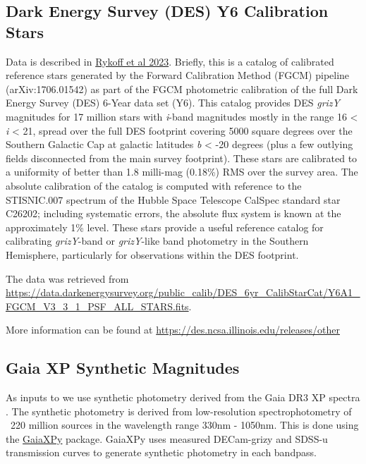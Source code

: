 \subsection{Dark Energy Survey (DES) Y6 Calibration Stars}
\label{sec:des}
Data is described in \href{https://arxiv.org/abs/2305.01695}{Rykoff et al 2023}.
Briefly, this is a catalog of calibrated reference stars generated by the Forward Calibration Method (FGCM) pipeline (arXiv:1706.01542) as part of the FGCM photometric calibration of the full Dark Energy Survey (DES) 6-Year data set (Y6). This catalog provides DES \textit{grizY} magnitudes for 17 million stars with \textit{i}-band magnitudes mostly in the range 16 < \textit{i} < 21, spread over the full DES footprint covering 5000 square degrees over the Southern Galactic Cap at galactic latitudes \textit{b} < -20 degrees (plus a few outlying fields disconnected from the main survey footprint). 
These stars are calibrated to a uniformity of better than 1.8 milli-mag (0.18\%) RMS over the survey area. 
The absolute calibration of the catalog is computed with reference to the STISNIC.007 spectrum of the Hubble Space Telescope CalSpec standard star C26202; including systematic errors, the absolute flux system is known at the approximately 1\% level. 
These stars provide a useful reference catalog for calibrating \textit{grizY}-band or \textit{grizY}-like band photometry in the Southern Hemisphere, particularly for observations within the DES footprint.

The data was retrieved from \url{https://data.darkenergysurvey.org/public_calib/DES_6yr_CalibStarCat/Y6A1_FGCM_V3_3_1_PSF_ALL_STARS.fits}.

More information can be found at \url{https://des.ncsa.illinois.edu/releases/other}


\subsection{Gaia XP Synthetic Magnitudes}
\label{sec:gaiaxp}
As inputs to \monster we use synthetic photometry derived from the Gaia DR3 XP spectra \citep{GaiaCollaboration:2023}. 
The synthetic photometry is derived from low-resolution spectrophotometry of ~220 million sources in the wavelength range 330nm - 1050nm. 
This is done using the \href{https://github.com/gaia-dpci/GaiaXPy/cd}{GaiaXPy} package. 
GaiaXPy uses measured DECam-grizy and SDSS-u transmission curves to generate synthetic photometry in each bandpass. 


